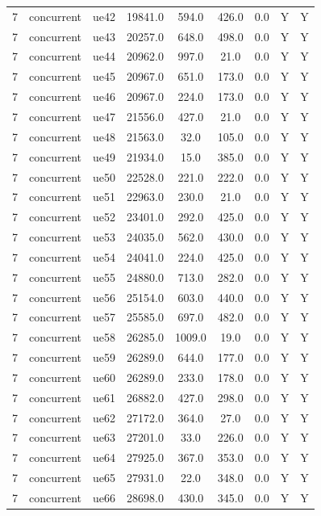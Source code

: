 \begin{table}[ht]
\begin{tabular}{|c|c|c|c|c|c|c|c|c|}
7 & concurrent & ue42 & 19841.0 & 594.0 & 426.0 & 0.0 & Y & Y \\
7 & concurrent & ue43 & 20257.0 & 648.0 & 498.0 & 0.0 & Y & Y \\
7 & concurrent & ue44 & 20962.0 & 997.0 & 21.0 & 0.0 & Y & Y \\
7 & concurrent & ue45 & 20967.0 & 651.0 & 173.0 & 0.0 & Y & Y \\
7 & concurrent & ue46 & 20967.0 & 224.0 & 173.0 & 0.0 & Y & Y \\
7 & concurrent & ue47 & 21556.0 & 427.0 & 21.0 & 0.0 & Y & Y \\
7 & concurrent & ue48 & 21563.0 & 32.0 & 105.0 & 0.0 & Y & Y \\
7 & concurrent & ue49 & 21934.0 & 15.0 & 385.0 & 0.0 & Y & Y \\
7 & concurrent & ue50 & 22528.0 & 221.0 & 222.0 & 0.0 & Y & Y \\
7 & concurrent & ue51 & 22963.0 & 230.0 & 21.0 & 0.0 & Y & Y \\
7 & concurrent & ue52 & 23401.0 & 292.0 & 425.0 & 0.0 & Y & Y \\
7 & concurrent & ue53 & 24035.0 & 562.0 & 430.0 & 0.0 & Y & Y \\
7 & concurrent & ue54 & 24041.0 & 224.0 & 425.0 & 0.0 & Y & Y \\
7 & concurrent & ue55 & 24880.0 & 713.0 & 282.0 & 0.0 & Y & Y \\
7 & concurrent & ue56 & 25154.0 & 603.0 & 440.0 & 0.0 & Y & Y \\
7 & concurrent & ue57 & 25585.0 & 697.0 & 482.0 & 0.0 & Y & Y \\
7 & concurrent & ue58 & 26285.0 & 1009.0 & 19.0 & 0.0 & Y & Y \\
7 & concurrent & ue59 & 26289.0 & 644.0 & 177.0 & 0.0 & Y & Y \\
7 & concurrent & ue60 & 26289.0 & 233.0 & 178.0 & 0.0 & Y & Y \\
7 & concurrent & ue61 & 26882.0 & 427.0 & 298.0 & 0.0 & Y & Y \\
7 & concurrent & ue62 & 27172.0 & 364.0 & 27.0 & 0.0 & Y & Y \\
7 & concurrent & ue63 & 27201.0 & 33.0 & 226.0 & 0.0 & Y & Y \\
7 & concurrent & ue64 & 27925.0 & 367.0 & 353.0 & 0.0 & Y & Y \\
7 & concurrent & ue65 & 27931.0 & 22.0 & 348.0 & 0.0 & Y & Y \\
7 & concurrent & ue66 & 28698.0 & 430.0 & 345.0 & 0.0 & Y & Y \\

\end{tabular}
\end{table}
